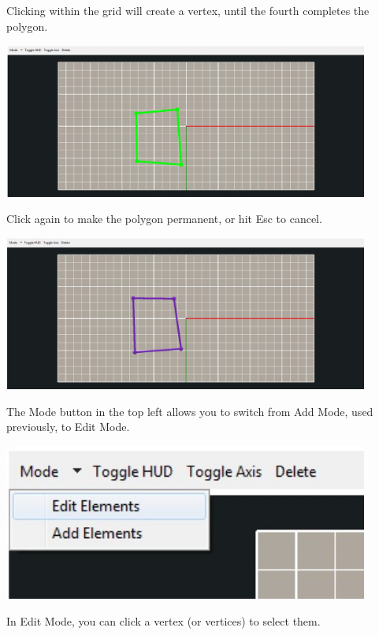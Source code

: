 \documentclass{article}
\begin{document}
Clicking within the grid will create a vertex, until the fourth completes the
polygon.

\begin{center}
\includegraphics[width=12cm]{images/AddPolygon}
\end{center}

Click again to make the polygon permanent, or hit Esc to cancel.

\begin{center}
\includegraphics[width=12cm]{images/NewPolygon}
\end{center}

The Mode button in the top left allows you to switch from Add Mode, used
previously, to Edit Mode.

\begin{center}
\includegraphics[width=12cm]{images/EditMode}
\end{center}

In Edit Mode, you can click a vertex (or vertices) to select them. 
\end{document}
